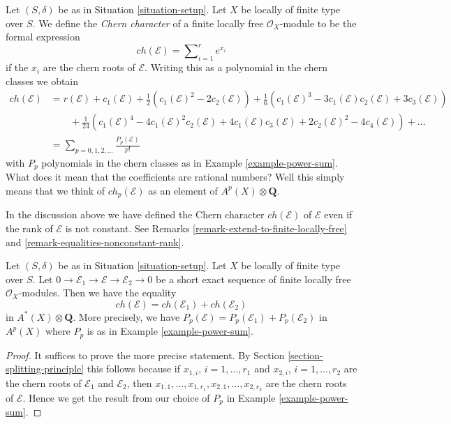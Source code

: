\noindent
Let $(S, \delta)$ be as in Situation \ref{situation-setup}.
Let $X$ be locally of finite type over $S$.
We define the {\it Chern character} of a finite locally free
$\mathcal{O}_X$-module to be the formal expression
$$
ch({\mathcal E}) = \sum\nolimits_{i=1}^r e^{x_i}
$$
if the $x_i$ are the chern roots of ${\mathcal E}$. Writing this
as a polynomial in the chern classes we obtain
\begin{align*}
ch(\mathcal{E})
& =
r(\mathcal{E})
+
c_1(\mathcal{E}) +
\frac{1}{2}(c_1(\mathcal{E})^2 - 2c_2(\mathcal{E}))
+
\frac{1}{6}(c_1(\mathcal{E})^3 - 3c_1(\mathcal{E})c_2(\mathcal{E}) + 3c_3(\mathcal{E})) \\
& \quad\quad +
\frac{1}{24}(c_1(\mathcal{E})^4 - 4c_1(\mathcal{E})^2c_2(\mathcal{E}) + 4c_1(\mathcal{E})c_3(\mathcal{E}) + 2c_2(\mathcal{E})^2 - 4c_4(\mathcal{E}))
+
\ldots \\
& =
\sum\nolimits_{p = 0, 1, 2, \ldots} \frac{P_p(\mathcal{E})}{p!}
\end{align*}
with $P_p$ polynomials in the chern classes as in
Example \ref{example-power-sum}.
What does it mean that the coefficients are rational numbers?
Well this simply means that we think of
$ch_p(\mathcal{E})$ as an element of $A^p(X) \otimes \mathbf{Q}$.

\begin{remark}
\label{remark-extend-chern-character-to-finite-locally-free}
In the discussion above we have defined the Chern character
$ch(\mathcal{E})$ of $\mathcal{E}$ even if the rank of $\mathcal{E}$
is not constant. See Remarks \ref{remark-extend-to-finite-locally-free} and
\ref{remark-equalities-nonconstant-rank}.
\end{remark}

\begin{lemma}
\label{lemma-chern-character-additive}
Let $(S, \delta)$ be as in Situation \ref{situation-setup}. Let $X$ be locally
of finite type over $S$. Let
$
0 \to \mathcal{E}_1 \to \mathcal{E} \to \mathcal{E}_2 \to 0
$
be a short exact sequence of finite locally free $\mathcal{O}_X$-modules.
Then we have the equality
$$
ch(\mathcal{E}) = ch(\mathcal{E}_1) + ch(\mathcal{E}_2)
$$
in $A^*(X) \otimes \mathbf{Q}$. More precisely, we have
$P_p(\mathcal{E}) = P_p(\mathcal{E}_1) + P_p(\mathcal{E}_2)$
in $A^p(X)$ where $P_p$ is as in Example \ref{example-power-sum}.
\end{lemma}

\begin{proof}
It suffices to prove the more precise statement. By
Section \ref{section-splitting-principle}
this follows because if $x_{1, i}$, $i = 1, \ldots, r_1$
and $x_{2, i}$, $i = 1, \ldots, r_2$ are the
chern roots of $\mathcal{E}_1$ and $\mathcal{E}_2$, then
$x_{1, 1}, \ldots, x_{1, r_1}, x_{2, 1}, \ldots, x_{2, r_2}$
are the chern roots of $\mathcal{E}$. Hence we get the result
from our choice of $P_p$ in Example \ref{example-power-sum}.
\end{proof}

